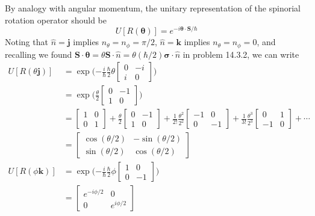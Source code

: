 \documentclass[../principles-of-quantum-mechanics.tex]{subfiles}
\begin{document}
\begin{questions}
\begin{solution}
			By analogy with angular momentum, the unitary representation of the spinorial rotation operator should be
			$$U[R(\boldsymbol{\theta})] = e^{-i\boldsymbol{\theta}\cdot\mathbf{S}/\hbar}$$
			Noting that $\hat{n} = \mathbf{j}$ implies $n_\theta = n_\phi = \pi/2$, $\hat{n} = \mathbf{k}$
			implies $n_\theta = n_\phi = 0$, and recalling we found $\mathbf{S}\cdot\boldsymbol{\theta} = \theta\mathbf{S}\cdot\hat{n} = \theta(\hbar/2)\boldsymbol{\sigma}\cdot\hat{n}$ in problem 14.3.2, we can write
			\begin{align*}
				U[R(\theta\mathbf{j})] &= \exp\Big({-\frac{i}{\hbar}}\frac{\hbar}{2}\theta\begin{bmatrix}0 & -i \\ i & 0\end{bmatrix}\Big) \\
				&= \exp\Big(\frac{\theta}{2}\begin{bmatrix}0 & -1 \\ 1 & 0\end{bmatrix}\Big) \\
				&= \begin{bmatrix}1 & 0 \\ 0 & 1\end{bmatrix} + \frac{\theta}{2}\begin{bmatrix}0 & -1 \\ 1 & 0\end{bmatrix} + \frac{1}{2!}\frac{\theta^2}{2^2}\begin{bmatrix}-1 & 0 \\ 0 & -1\end{bmatrix} + \frac{1}{3!}\frac{\theta^3}{2^3}\begin{bmatrix}0 & 1 \\ -1 & 0\end{bmatrix} + \cdots \\
				&= \begin{bmatrix}\cos(\theta/2) & -\sin(\theta/2) \\ \sin(\theta/2) & \cos(\theta/2) \end{bmatrix} \\
				U[R(\phi\mathbf{k})] &= \exp\Big({-\frac{i}{\hbar}}\frac{\hbar}{2}\phi\begin{bmatrix}1 & 0 \\ 0 & -1\end{bmatrix}\Big) \\
				&= \begin{bmatrix}e^{-i\phi/2} & 0 \\ 0 & e^{i\phi/2}\end{bmatrix}

\end{align*}
\end{solution}
\end{questions}
\end{document}
